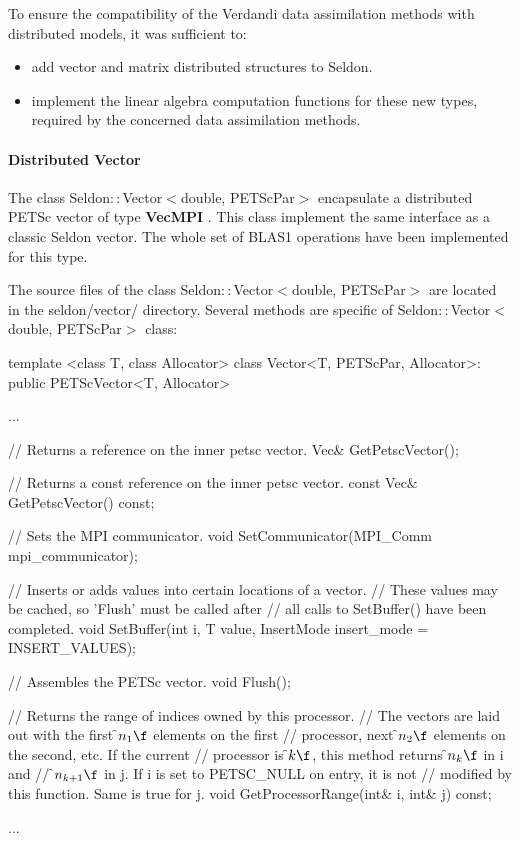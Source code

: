 \documentclass{tufte-book}
\begin{document}
To ensure the compatibility of the Verdandi data assimilation methods with distributed models,  it was sufficient to:

\begin{itemize}

\item add vector and matrix distributed structures to Seldon.

\item implement the linear algebra computation functions for these new types, required by the concerned data assimilation methods.

\end{itemize}

\hypertarget{seq-par-ds-vector}{}\paragraph{Distributed Vector}\label{seq-par-ds-vector}


The class Seldon$::$Vector$<$double, PETScPar$>$  encapsulate a distributed PETSc vector of type \textbf{VecMPI} . This class implement the same interface as a classic Seldon vector. The whole set of BLAS1 operations have been implemented for this type.

The source files of the class Seldon$::$Vector$<$double, PETScPar$>$  are located in the seldon/vector/ directory. Several methods are specific of  Seldon$::$Vector$<$double, PETScPar$>$ class:

\begin{frame_cpp}
template <class T, class Allocator>
class Vector<T, PETScPar, Allocator>: public PETScVector<T, Allocator>
{
	...

    // Returns a reference on the inner petsc vector.
    Vec& GetPetscVector();

    // Returns a const reference on the inner petsc vector.
    const Vec& GetPetscVector() const;

    // Sets the MPI communicator.
    void SetCommunicator(MPI_Comm mpi_communicator);

    // Inserts or adds values into certain locations of a vector.
    // \warning These values may be cached, so 'Flush' must be called after
    // all calls to SetBuffer() have been completed.
    void SetBuffer(int i, T value, InsertMode insert_mode = INSERT_VALUES);

    // Assembles the PETSc vector.
    void Flush();

    // Returns the range of indices owned by this processor.
    // The vectors are laid out with the first \f$n_1\f$ elements on the first
    // processor, next \f$n_2\f$ elements on the second, etc. If the current
    // processor is \f$k\f$, this method returns \f$n_k\f$ in \a i and
    // \f$n_{k+1}\f$ in \a j. If \a i is set to PETSC_NULL on entry, it is not
    // modified by this function. Same is true for \a j.
    void GetProcessorRange(int& i, int& j) const;

    ...
}
\end{frame_cpp}
\end{document}
